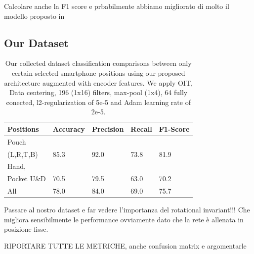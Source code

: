 Calcolare anche la F1 score e prbabilmente abbiamo migliorato di molto il modello proposto in \cite{blunck2013heterogeneity}

\subsection{Our Dataset}

\begin{table}[t]
	\begin{center}
		\begin{tabular}{ p{1.8cm}p{1.2cm}p{1.2cm}p{0.9cm}p{1.4cm}} 
			\hline
			Positions & Accuracy & Precision & Recall & F1-Score \\ 
			\hline
			Pouch \\(L,R,T,B) & 85.3 & 92.0 & 73.8 & 81.9 \\ 
			\hline
			Hand, \\ Pocket U\&D & 70.5 & 79.5 & 63.0 & 70.2 \\
			\hline
			All & 78.0 & 84.0 & 69.0 & 75.7 \\
			\hline
		\end{tabular}
		\caption{\label{tab:model-performance} Our collected dataset classification comparisons between only certain selected smartphone positions using our proposed architecture augmented with encoder features. We apply OIT, Data centering, 196 (1x16) filters, max-pool (1x4), 64 fully conected, l2-regularization of 5e-5 and Adam learning rate of 2e-5. }
	\end{center}
\end{table}

Passare al nostro dataset e far vedere l'importanza del rotational invariant!!! Che migliora sensibilmente le performance ovviamente dato che la rete è allenata in posizione fisse.

RIPORTARE TUTTE LE METRICHE, anche confusion matrix e argomentarle
